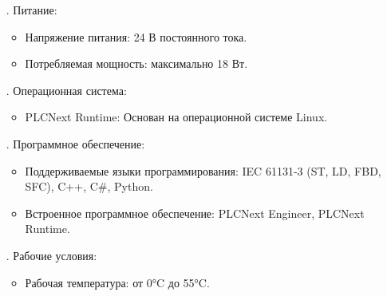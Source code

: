 {\begin{itemize}[leftmargin=2.15cm, labelwidth=0.65cm, labelsep=0.0cm]
\begin{itemize}[leftmargin=1.15cm, labelwidth=0.65cm, labelsep=0.0cm]
		\end{itemize}
		
		\addtocounter{itemcntr}{1}
		
		\item[\theitemcntr. ] Питание:
		
			\begin{itemize}[leftmargin=1.15cm, labelwidth=0.65cm, labelsep=0.0cm] 
			
			\item Напряжение питания: 24 В постоянного тока.
			
			\item Потребляемая мощность: максимально 18 Вт.
			
		    \end{itemize}
		    
		\addtocounter{itemcntr}{1}
		    
		\item[\theitemcntr. ] Операционная система:
		
		\begin{itemize}[leftmargin=1.15cm, labelwidth=0.65cm, labelsep=0.0cm] 
			
			\item PLCNext Runtime: Основан на операционной системе Linux.
			
		\end{itemize}
		
		\addtocounter{itemcntr}{1}
		
		\item[\theitemcntr. ] Программное обеспечение:
		
		\begin{itemize}[leftmargin=1.15cm, labelwidth=0.65cm, labelsep=0.0cm] 
			
			\item Поддерживаемые языки программирования: IEC 61131-3 (ST, LD, FBD, SFC), C++, C\#, Python.
			
			\item Встроенное программное обеспечение: PLCNext Engineer, PLCNext Runtime.
			
		\end{itemize}
		
		\addtocounter{itemcntr}{1}
		
		\item[\theitemcntr. ] Рабочие условия:
		
		\begin{itemize}[leftmargin=1.15cm, labelwidth=0.65cm, labelsep=0.0cm] 
			
			\item Рабочая температура: от 0°C до 55°C.
			

\end{itemize}
\end{itemize}}
